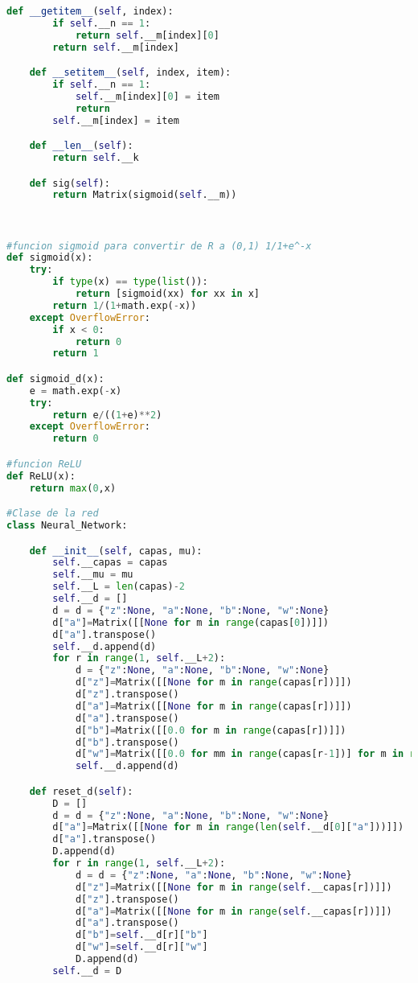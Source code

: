 \documentclass{article}
\begin{document}
\begin{lstlisting}[language=Python]
    def __getitem__(self, index):
        if self.__n == 1:
            return self.__m[index][0]
        return self.__m[index]

    def __setitem__(self, index, item):
        if self.__n == 1:
            self.__m[index][0] = item
            return
        self.__m[index] = item

    def __len__(self):
        return self.__k

    def sig(self):
        return Matrix(sigmoid(self.__m))
        


#funcion sigmoid para convertir de R a (0,1) 1/1+e^-x
def sigmoid(x):
    try:
        if type(x) == type(list()):
            return [sigmoid(xx) for xx in x]
        return 1/(1+math.exp(-x))
    except OverflowError:
        if x < 0:
            return 0
        return 1

def sigmoid_d(x):
    e = math.exp(-x)
    try:
        return e/((1+e)**2)
    except OverflowError:
        return 0

#funcion ReLU
def ReLU(x):
    return max(0,x)

#Clase de la red
class Neural_Network:

    def __init__(self, capas, mu):
        self.__capas = capas
        self.__mu = mu
        self.__L = len(capas)-2
        self.__d = []
        d = d = {"z":None, "a":None, "b":None, "w":None}
        d["a"]=Matrix([[None for m in range(capas[0])]])
        d["a"].transpose()
        self.__d.append(d)
        for r in range(1, self.__L+2):
            d = {"z":None, "a":None, "b":None, "w":None}
            d["z"]=Matrix([[None for m in range(capas[r])]])
            d["z"].transpose()
            d["a"]=Matrix([[None for m in range(capas[r])]])
            d["a"].transpose()
            d["b"]=Matrix([[0.0 for m in range(capas[r])]])
            d["b"].transpose()
            d["w"]=Matrix([[0.0 for mm in range(capas[r-1])] for m in range(capas[r])])
            self.__d.append(d)

    def reset_d(self):
        D = []
        d = d = {"z":None, "a":None, "b":None, "w":None}
        d["a"]=Matrix([[None for m in range(len(self.__d[0]["a"]))]])
        d["a"].transpose()
        D.append(d)
        for r in range(1, self.__L+2):
            d = d = {"z":None, "a":None, "b":None, "w":None}
            d["z"]=Matrix([[None for m in range(self.__capas[r])]])
            d["z"].transpose()
            d["a"]=Matrix([[None for m in range(self.__capas[r])]])
            d["a"].transpose()
            d["b"]=self.__d[r]["b"]
            d["w"]=self.__d[r]["w"]
            D.append(d)
        self.__d = D


\end{lstlisting}
\end{document}
